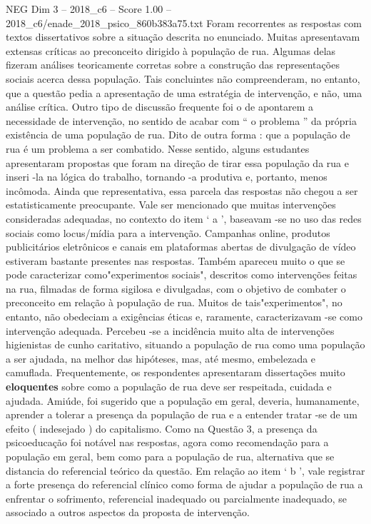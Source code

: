 \begin{textsample}{NEG Dim 3 – 2018\_c6 – Score 1.00 – 2018\_c6/enade\_2018\_psico\_860b383a75.txt}
Foram recorrentes as respostas com textos dissertativos sobre a situação descrita no enunciado.
Muitas apresentavam extensas críticas ao preconceito dirigido à população de rua.
Algumas delas fizeram análises teoricamente corretas sobre a construção das representações sociais acerca dessa população.
Tais concluintes não compreenderam, no entanto, que a questão pedia a apresentação de uma estratégia de intervenção, e não, uma análise crítica.
Outro tipo de discussão frequente foi o de apontarem a necessidade de intervenção, no sentido de acabar com “ o problema ” da própria existência de uma população de rua.
Dito de outra forma : que a população de rua é um problema a ser combatido.
Nesse sentido, alguns estudantes apresentaram propostas que foram na direção de tirar essa população da rua e inseri -la na lógica do trabalho, tornando -a produtiva e, portanto, menos incômoda.
Ainda que representativa, essa parcela das respostas não chegou a ser estatisticamente preocupante.
Vale ser mencionado que muitas intervenções consideradas adequadas, no contexto do item ‘ a ’, baseavam -se no uso das redes sociais como locus/mídia para a intervenção.
Campanhas online, produtos publicitários eletrônicos e canais em plataformas abertas de divulgação de vídeo estiveram bastante presentes nas respostas.
Também apareceu muito o que se pode caracterizar como"experimentos sociais", descritos como intervenções feitas na rua, filmadas de forma sigilosa e divulgadas, com o objetivo de combater o preconceito em relação à população de rua.
Muitos de tais"experimentos", no entanto, não obedeciam a exigências éticas e, raramente, caracterizavam -se como intervenção adequada.
Percebeu -se a incidência muito alta de intervenções higienistas de cunho caritativo, situando a população de rua como uma população a ser ajudada, na melhor das hipóteses, mas, até mesmo, embelezada e camuflada.
Frequentemente, os respondentes apresentaram dissertações muito \textbf{eloquentes} sobre como a população de rua deve ser respeitada, cuidada e ajudada.
Amiúde, foi sugerido que a população em geral, deveria, humanamente, aprender a tolerar a presença da população de rua e a entender tratar -se de um efeito ( indesejado ) do capitalismo.
Como na Questão 3, a presença da psicoeducação foi notável nas respostas, agora como recomendação para a população em geral, bem como para a população de rua, alternativa que se distancia do referencial teórico da questão.
Em relação ao item ‘ b ’, vale registrar a forte presença do referencial clínico como forma de ajudar a população de rua a enfrentar o sofrimento, referencial inadequado ou parcialmente inadequado, se associado a outros aspectos da proposta de intervenção.

\end{textsample}
